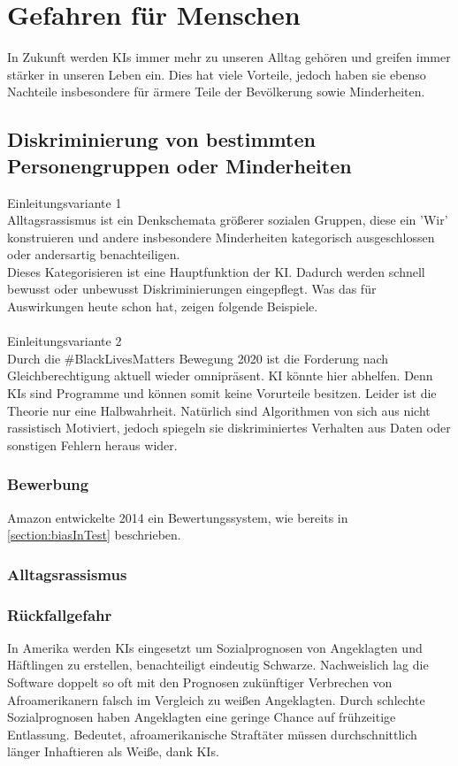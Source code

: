 \documentclass[12pt,oneside,a4paper,parskip]{scrbook}
\begin{document}
\section{Gefahren für Menschen}
In Zukunft werden KIs immer mehr zu unseren Alltag gehören und greifen immer stärker in unseren Leben ein. Dies hat viele Vorteile, jedoch haben sie ebenso Nachteile insbesondere für ärmere Teile der Bevölkerung sowie Minderheiten.
\subsection{Diskriminierung von bestimmten Personengruppen oder Minderheiten}
Einleitungsvariante 1 \\
Alltagsrassismus ist ein Denkschemata größerer sozialen Gruppen, diese ein 'Wir' konstruieren und andere insbesondere Minderheiten kategorisch ausgeschlossen oder andersartig benachteiligen.\\
Dieses Kategorisieren ist eine Hauptfunktion der KI. Dadurch werden schnell bewusst oder unbewusst Diskriminierungen eingepflegt. Was das für Auswirkungen heute schon hat, zeigen folgende Beispiele.
\\\\ Einleitungsvariante 2\\
Durch die \#BlackLivesMatters Bewegung 2020 ist die Forderung nach Gleichberechtigung aktuell wieder omnipräsent. KI könnte hier abhelfen. Denn KIs sind Programme und können somit keine Vorurteile besitzen. Leider ist die Theorie nur eine Halbwahrheit. Natürlich sind Algorithmen von sich aus nicht rassistisch Motiviert, jedoch spiegeln sie diskriminiertes Verhalten aus Daten oder sonstigen Fehlern heraus wider.
\subsubsection{Bewerbung}
Amazon entwickelte 2014 ein Bewertungssystem, wie bereits in \ref{section:biasInTest} beschrieben.
\subsubsection{Alltagsrassismus}

\subsubsection{Rückfallgefahr}
In Amerika werden KIs eingesetzt um Sozialprognosen von Angeklagten und Häftlingen zu erstellen, benachteiligt eindeutig Schwarze. Nachweislich lag die Software doppelt so oft mit den Prognosen zukünftiger Verbrechen von Afroamerikanern falsch im Vergleich zu weißen Angeklagten. Durch schlechte Sozialprognosen haben Angeklagten eine geringe Chance auf frühzeitige Entlassung. Bedeutet, afroamerikanische Straftäter müssen durchschnittlich länger Inhaftieren als Weiße, dank KIs.
\end{document}
